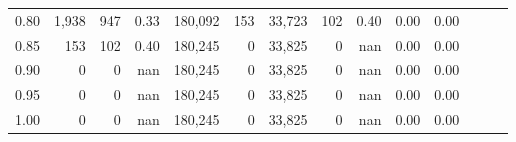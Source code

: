 \begin{tabular}{rrrrrrrrrrrrrr}
0.80 &   1,938 &    947 &  0.33 &  180,092 &      153 &  33,723 &     102 &  0.40 &  0.00 &      0.00 \\
0.85 &     153 &    102 &  0.40 &  180,245 &        0 &  33,825 &       0 &   nan &  0.00 &      0.00 \\
0.90 &       0 &      0 &   nan &  180,245 &        0 &  33,825 &       0 &   nan &  0.00 &      0.00 \\
0.95 &       0 &      0 &   nan &  180,245 &        0 &  33,825 &       0 &   nan &  0.00 &      0.00 \\
1.00 &       0 &      0 &   nan &  180,245 &        0 &  33,825 &       0 &   nan &  0.00 &      0.00 \\
\bottomrule
\end{tabular}
